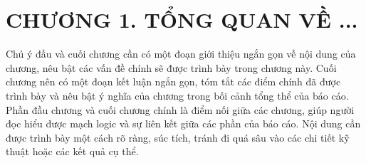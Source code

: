 \section*{CHƯƠNG 1. TỔNG QUAN VỀ ...}
\setcounter{section}{1}
\setcounter{subsection}{0}
\setcounter{figure}{0}
\setcounter{table}{0}

Chú ý đầu và cuối chương cần có một đoạn giới thiệu ngắn gọn về nội dung của chương, nêu bật các vấn đề chính sẽ được trình bày trong chương này. Cuối chương nên có một đoạn kết luận ngắn gọn, tóm tắt các điểm chính đã được trình bày và nêu bật ý nghĩa của chương trong bối cảnh tổng thể của báo cáo. Phần đầu chương và cuối chương chính là điểm nối giữa các chương, giúp người đọc hiểu được mạch logic và sự liên kết giữa các phần của báo cáo. Nội dung cần được trình bày một cách rõ ràng, súc tích, tránh đi quá sâu vào các chi tiết kỹ thuật hoặc các kết quả cụ thể.

\newpage
\cleardoublepage